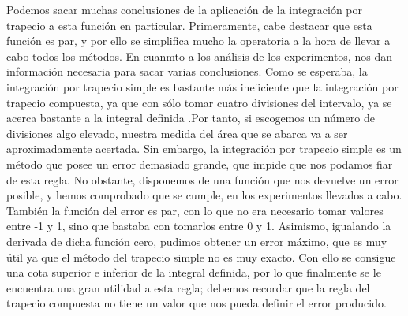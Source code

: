 \parindent=1cm
\raggedright
Podemos sacar muchas conclusiones de la aplicación de la integración por trapecio a esta función en particular.
Primeramente, cabe destacar que esta función es par, y por ello se simplifica mucho la operatoria a la hora de llevar a cabo todos los métodos.
En cuanmto a los análisis de los experimentos, nos dan información necesaria para sacar varias conclusiones. Como se esperaba, la integración por trapecio simple
es bastante más ineficiente que la integración por trapecio compuesta, ya que con sólo tomar cuatro divisiones del intervalo, ya se acerca bastante a la integral
definida .Por tanto, si escogemos un número de divisiones algo elevado, nuestra medida del área que se abarca va a ser aproximadamente acertada. 
Sin embargo, la integración por trapecio simple es un método que posee un error demasiado grande, que impide que nos podamos fiar de esta regla.
 No obstante, disponemos de una función que nos devuelve un error posible, y hemos comprobado que se cumple, en los experimentos llevados a cabo.
También la función del error es par, con lo que no era necesario tomar valores entre -1 y 1, sino que bastaba con tomarlos entre 0 y 1. Asimismo, igualando la
derivada de dicha función cero, pudimos obtener un error máximo, que es muy útil ya que el método del trapecio simple no es muy exacto. Con ello se consigue una cota 
superior e inferior de la integral definida, por lo que finalmente se le encuentra una gran utilidad a esta regla; debemos recordar que la regla del
trapecio compuesta no tiene un valor que nos pueda definir el error producido.
